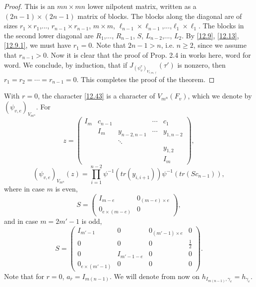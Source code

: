 \documentclass[12pts]{amsart}
\begin{document}
\begin{proof}
This is an $mn\times mn$ lower nilpotent matrix, written as a $(2n-1)\times (2n-1)$ matrix of blocks. The blocks along the diagonal are of sizes $r_1\times r_1$,..., $r_{n-1}\times r_{n-1}$, $m\times m$, $\ell_{n-1}\times \ell_{n-1}$,...,$\ell_1\times \ell_1$. The blocks in the second lower diagonal are $R_1$,..., $R_{n-1}$, $S$, $L_{n-2}$,..., $L_2$. 
By \eqref{12.9}, \eqref{12.13}, \eqref{12.9.1}, we must have $r_1=0$. Note that $2n-1>n$, i.e. $n\geq 2$, since we assume that $r_{n-1}>0$. Now it is clear that the proof of Prop. 2.4 in \cite{GS18} works here, word for word. We conclude, by induction, that if $J_{(\psi^e_v)_{V_{\bar{r},m,\underline{\ell}}}}(\tau')$ is nonzero, then $r_1=r_2=\cdots=r_{n-1}=0$. This completes the proof of the theorem.
\end{proof}

With $r=0$, the character \eqref{12.43} is a character of $V_{m^n}(F_v)$, which we denote by $(\psi_{v,e})_{V_{m^n}}$. For
$$
z=\begin{pmatrix}I_m&c_{n-1}&&\cdots&c_1\\&I_m&y_{n-2,n-1}&\cdots&y_{1,n-2}\\&&\ddots\\&&&&y_{1,2}\\
&&&&I_m\end{pmatrix},
$$
\begin{equation}\label{12.44}
(\psi_{v,e})_{V_{m^n}}(z)
=\prod_{i=1}^{n-2}\psi^{-1}(tr(y_{i,i+1}))\psi^{-1}(tr(Sc_{n-1})),
\end{equation}
where in case $m$ is even,
$$
S=\begin{pmatrix}I_{m-e}&0_{(m-e)\times e}\\0_{e\times
	(m-e)}&0\end{pmatrix},
$$
and in case $m=2m'-1$ is odd,
$$
S=\begin{pmatrix}I_{m'-1}&0&0_{(m'-1)\times
	e}&0\\0&0&0&\frac{1}{2}\\0&I_{m'-1-e}&0&0\\0_{e\times (m'-1)}&0&0&0\end{pmatrix}.
$$
Note that for $r=0$, $a_{\bar{r}}=I_{m(n-1)}$. We will denote from now on $h_{I_{m(n-1)},\gamma_e}=h_{\gamma_e}$.
\end{document}
